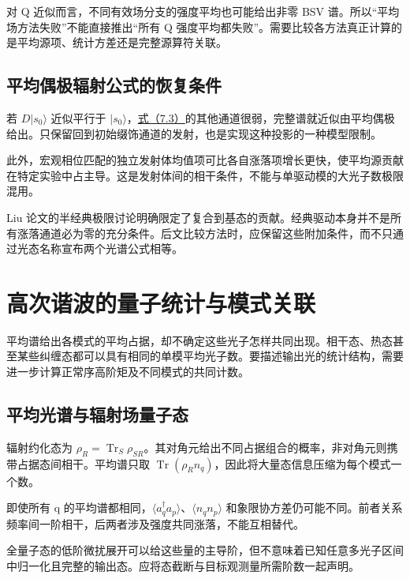 \documentclass[UTF8,a4paper,zihao=-4,openany,fontset=fandol]{ctexbook}
\begin{document}
对 Q 近似而言，不同有效场分支的强度平均也可能给出非零 BSV 谱。所以“平均场方法失败”不能直接推出“所有 Q 强度平均都失败”。需要比较各方法真正计算的是平均源项、统计方差还是完整源算符关联。



\section{平均偶极辐射公式的恢复条件}\label{sec:07:10}


若 $D|s_0\rangle$ 近似平行于 $|s_0\rangle$，\hyperref[eq:7.3]{式（7.3）}的其他通道很弱，完整谱就近似由平均偶极给出。只保留回到初始缀饰通道的发射，也是实现这种投影的一种模型限制。



此外，宏观相位匹配的独立发射体均值项可比各自涨落项增长更快，使平均源贡献在特定实验中占主导。这是发射体间的相干条件，不能与单驱动模的大光子数极限混用。



Liu 论文的半经典极限讨论明确限定了复合到基态的贡献。经典驱动本身并不是所有涨落通道必为零的充分条件。后文比较方法时，应保留这些附加条件，而不只通过光态名称宣布两个光谱公式相等。



\chapter{高次谐波的量子统计与模式关联}\label{ch:08}


平均谱给出各模式的平均占据，却不确定这些光子怎样共同出现。相干态、热态甚至某些纠缠态都可以具有相同的单模平均光子数。要描述输出光的统计结构，需要进一步计算正常序高阶矩及不同模式的共同计数。



\section{平均光谱与辐射场量子态}\label{sec:08:1}


辐射约化态为 $\rho_R=\operatorname{Tr}_S\rho_{SR}$。其对角元给出不同占据组合的概率，非对角元则携带占据态间相干。平均谱只取 $\operatorname{Tr}(\rho_Rn_q)$，因此将大量态信息压缩为每个模式一个数。



即使所有 q 的平均谱都相同，$\langle a_q^\dagger a_p\rangle$、$\langle n_qn_p\rangle$ 和象限协方差仍可能不同。前者关系频率间一阶相干，后两者涉及强度共同涨落，不能互相替代。



全量子态的低阶微扰展开可以给这些量的主导阶，但不意味着已知任意多光子区间中归一化且完整的输出态。应将态截断与目标观测量所需阶数一起声明。
\end{document}

